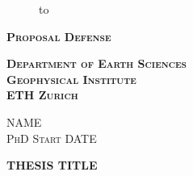 %

\begin{titlepage}
\begin{figure}[b!]
  \begin{center}
    \hbox to 
  \end{center}
\end{figure}
\begin{center}
\rule{0pt}{0pt}

\begin{Large}
\textbf{\textsc{Proposal Defense}}\\[0.75ex]
\vspace*{0.75cm}

\textbf{\textsc{Department of Earth Sciences}\\[0.75ex]
\textsc{Geophysical Institute}\\[0.75ex]
\textsc{ETH Zurich}\\[0.75ex]}
\vspace*{0.75cm}

\textsc{NAME}\\[0.75ex]
\textsc{PhD Start DATE}\\[0.75ex]
\vspace*{1cm}
\end{Large}
\begin{LARGE}
\textbf{\textsc{THESIS TITLE}}\\[0.75ex]
\end{LARGE}
\vspace*{1cm}


\end{center}
\end{titlepage}
